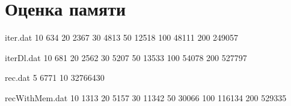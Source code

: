 \documentclass[12pt]{report}
\begin{document}
\section{Оценка памяти}

\begin{filecontents}{iter.dat}
10      634
20      2367
30      4813
50      12518
100     48111
200     249057
\end{filecontents}

\begin{filecontents}{iterDl.dat}
10      681
20      2562
30      5207
50      13533
100     54078
200     527797
\end{filecontents}

\begin{filecontents}{rec.dat}
5       6771
10      32766430
\end{filecontents}

\begin{filecontents}{recWithMem.dat}
10      1313
20      5157
30      11342
50      30066
100     116134
200     529335
\end{filecontents}
\end{document}
